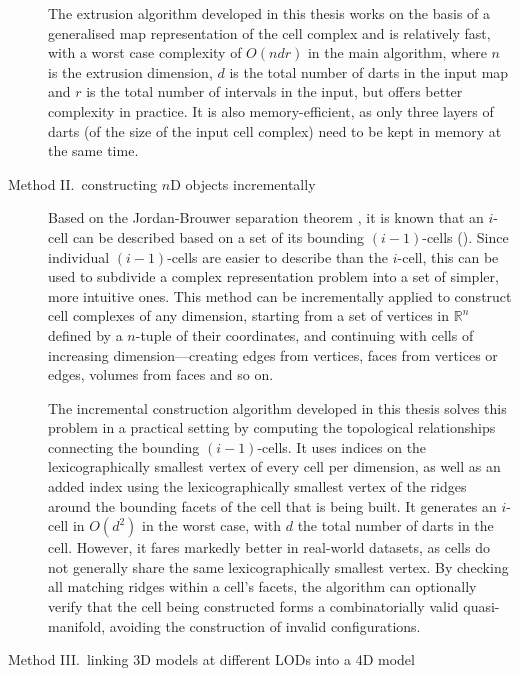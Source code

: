 \begin{description}
The extrusion algorithm developed in this thesis works on the basis of a generalised map representation of the cell complex and is relatively fast, with a worst case complexity of $O(ndr)$ in the main algorithm, where $n$ is the extrusion dimension, $d$ is the total number of darts in the input map and $r$ is the total number of intervals in the input, but offers better complexity in practice.
It is also memory-efficient, as only three layers of darts (of the size of the input cell complex) need to be kept in memory at the same time.


\item[Method II.\ constructing $n$D objects incrementally]

Based on the Jordan-Brouwer separation theorem \citep{Lebesgue11,Brouwer11}, it is known that an $i$-cell can be described based on a set of its bounding $(i-1)$-cells ().
Since individual $(i-1)$-cells are easier to describe than the $i$-cell, this can be used to subdivide a complex representation problem into a set of simpler, more intuitive ones.
This method can be incrementally applied to construct cell complexes of any dimension, starting from a set of vertices in $\mathbb{R}^n$ defined by a $n$-tuple of their coordinates, and continuing with cells of increasing dimension---creating edges from vertices, faces from vertices or edges, volumes from faces and so on.

The incremental construction algorithm developed in this thesis solves this problem in a practical setting by computing the topological relationships connecting the bounding $(i-1)$-cells.
It uses indices on the lexicographically smallest vertex of every cell per dimension, as well as an added index using the lexicographically smallest vertex of the ridges around the bounding facets of the cell that is being built.
It generates an $i$-cell in $O(d^{2})$ in the worst case, with $d$ the total number of darts in the cell.
However, it fares markedly better in real-world datasets, as cells do not generally share the same lexicographically smallest vertex.
By checking all matching ridges within a cell's facets, the algorithm can optionally verify that the cell being constructed forms a combinatorially valid quasi-manifold, avoiding the construction of invalid configurations.


\item[Method III.\ linking 3D models at different LODs into a 4D model]


\end{description}
